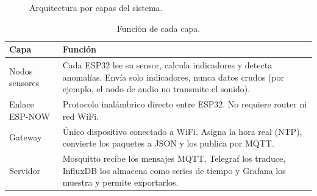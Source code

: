 \documentclass[11pt,a4paper]{article}
\begin{document}
\begin{figure}[H]
\caption{Arquitectura por capas del sistema.}
\label{fig:arquitectura}
\end{figure}

\begin{table}[H]
\centering
\caption{Funci\'on de cada capa.}
\begin{tabularx}{\textwidth}{@{}lX@{}}
\toprule
\textbf{Capa} & \textbf{Funci\'on} \\
\midrule
Nodos sensores & Cada ESP32 lee su sensor, calcula indicadores y detecta anomal\'ias. Env\'ia solo
indicadores, nunca datos crudos (por ejemplo, el nodo de audio no transmite el sonido). \\
Enlace ESP-NOW & Protocolo inal\'ambrico directo entre ESP32. No requiere router ni red WiFi. \\
Gateway & \'Unico dispositivo conectado a WiFi. Asigna la hora real (NTP), convierte los
paquetes a JSON y los publica por MQTT. \\
Servidor & Mosquitto recibe los mensajes MQTT, Telegraf los traduce, InfluxDB los almacena
como series de tiempo y Grafana los muestra y permite exportarlos. \\
\bottomrule
\end{tabularx}
\end{table}
\end{document}
